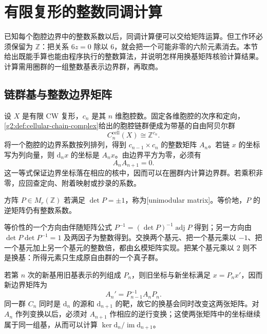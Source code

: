 
% 
% 
% 

\section{有限复形的整数同调计算}
\label{g2:sec:0304}

已知每个胞腔边界中的整数系数以后，同调计算便可以交给矩阵运算。但工作环必须保留为 \(\mathbb Z\)：把关系 \(6z=0\) 除以 \(6\)，就会把一个可能非零的六阶元素消去。本节给出既能手算也能由程序执行的整数算法，并说明怎样用换基矩阵核验计算结果。计算需用圈群的一组整数基表示边界群，再取商。

\subsection{链群基与整数边界矩阵}
\label{g2:subsec:0304:01}

设 \(X\) 是有限 CW 复形，\(c_n\) 是其 \(n\) 维胞腔数。固定各维胞腔的次序和定向，\cref{g2:def:cellular-chain-complex}给出的胞腔链群便成为带基的自由阿贝尔群
\[
	C_n^{\mathrm{cell}}(X)\cong\mathbb Z^{c_n}.
\]
将一个胞腔的边界系数按列排列，得到 \(c_{n-1}\times c_n\) 的整数矩阵 \(A_n\)。若链 \(x\) 的坐标写为列向量，则 \(\mathrm{d}_nx\) 的坐标是 \(A_nx\)。由边界平方为零，必须有
\[
	A_nA_{n+1}=0.
\]
这一等式保证边界坐标落在相应的核中，因而可以在圈群内计算边界群。若乘积非零，应回查定向、附着映射或抄录的系数。

\begin{definition}\label{g2:def:unimodular-matrix}
	方阵 \(P\in M_r(\mathbb Z)\) 若满足 \(\det P=\pm1\)，称为[unimodular matrix]。等价地，\(P\) 的逆矩阵仍有整数系数。
\end{definition}

等价性的一个方向由伴随矩阵公式 \(P^{-1}=(\det P)^{-1}\operatorname{adj}P\) 得到；另一方向由 \(\det P\det P^{-1}=1\) 及两因子为整数得到。交换两个基元、把一个基元乘以 \(-1\)、把一个基元加上另一个基元的整数倍，都由幺模矩阵实现。把某个基元乘以 \(2\) 则不是换基：所得元素只生成原自由群的一个真子群。

\ProseParagraphBreak

若第 \(n\) 次的新基用旧基表示的列组成 \(P_n\)，则旧坐标与新坐标满足 \(x=P_nx'\)，因而新边界矩阵为
\begin{equation}\label{g2:eq:boundary-matrix-change}
	A_n'=P_{n-1}^{-1}A_nP_n.
\end{equation}
同一群 \(C_n\) 同时是 \(\mathrm{d}_n\) 的源和 \(\mathrm{d}_{n+1}\) 的靶，故它的换基会同时改变这两张矩阵。对 \(A_n\) 作列变换以后，必须对 \(A_{n+1}\) 作相应的逆行变换；这使两张矩阵中的坐标继续属于同一组基，从而可以计算 \(\ker\mathrm{d}_n/\operatorname{im}\mathrm{d}_{n+1}\)。

